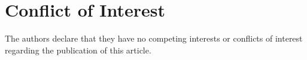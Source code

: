 \documentclass[10pt]{article}
\begin{document}
	
	
	
	
	\section*{Conflict of Interest}
	
	The authors declare that they have no competing interests or conflicts of interest regarding the publication of this article.
	
	
	\printbibliography
	
	
	
	
\end{document}
